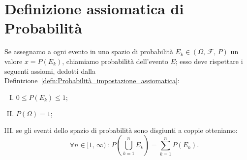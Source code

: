     \section{Definizione assiomatica di Probabilità}
        \begin{defn}
            Se assegnamo a ogni evento in uno spazio di probabilità $E_k \in (\Omega,\,\mathscr{F},\,P)$ un valore $x = P(E_k)$, chiamiamo probabilità dell'evento $E$; esso deve rispettare i seguenti assiomi, dedotti dalla Definizione~\ref{defn:Probabilità_impostazione_assiomatica}:
            \begin{enumerate}[I)]
                \item $0 \leq P(E_k) \leq 1$;
                \item $P(\Omega) = 1$;
                \item  se gli eventi dello spazio di probabilità sono disgiunti a coppie otteniamo: \[
                \forall n \in [1,\,\infty)\,:\,P(\bigcup_{k=1}^{n} E_k) = \sum_{k=1}^{n} P(E_k)
                .\] 
            \end{enumerate}
        \end{defn}
